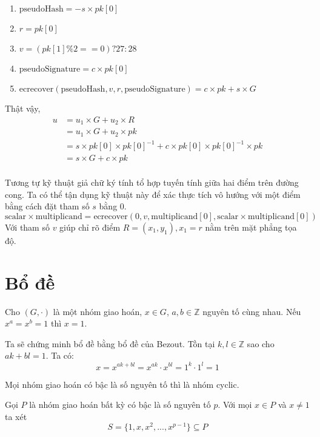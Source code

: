 \documentclass[../main.tex]{subfiles}
\begin{document}
\begin{enumerate}
    \item $\text{pseudoHash} = -s\times pk[0]$
    \item $r = pk[0]$
    \item $v =(pk[1]\%2 ==0)?27:28$
    \item $\text{pseudoSignature} = c \times pk[0]$
    \item $\text{ecrecover}(\text{pseudoHash}, v, r, \text{pseudoSignature}) = c\times pk + s \times G$
\end{enumerate}
Thật vậy,
\begin{align*}
    u   &= u_1 \times G + u_2 \times R\\
        &= u_1 \times G + u_2 \times pk\\
        &= s\times pk[0] \times pk[0]^{-1} + c\times pk[0] \times pk[0]^{-1} \times pk\\
        &= s \times G + c \times pk\\
\end{align*}

Tương tự kỹ thuật giả chữ ký tính tổ hợp tuyến tính giữa hai điểm trên đường cong. Ta có thể tận dụng kỹ thuật này để xác thực tích vô hướng với một điểm bằng cách đặt tham số $s$ bằng $0$.
\begin{equation*}
    \text{scalar} \times \text{multiplicand} = \text{ecrecover}(0,v,\text{multiplicand}[0],\text{scalar} \times \text{multiplicand}[0])
\end{equation*}
Với tham số $v$ giúp chỉ rõ điểm $R = (x_1,y_1), x_1 = r$ nằm trên mặt phẳng tọa độ.
\section{Bổ đề}
\begin{bd}
\label{bd:_primeGroup}
Cho $(G,\cdot)$ là một nhóm giao hoán, $x \in G$, $a,b \in \mathbb{Z}$ nguyên tố cùng nhau. Nếu $x^a = x^b = 1$ thì $x=1$.
\end{bd}

Ta sẽ chứng minh bổ đề bằng bổ đề của Bezout. Tồn tại $k,l \in \mathbb{Z}$ sao cho $ak+bl = 1$. Ta có:
\begin{equation*}
    x = x^{ak+bl} = x^{ak}\cdot x^{bl} = 1^k \cdot 1^l = 1
\end{equation*}

\begin{bd}
\label{bd:primeGroup}
Mọi nhóm giao hoán có bậc là số nguyên tố thì là nhóm cyclic.
\end{bd}
Gọi $P$ là nhóm giao hoán bất kỳ có bậc là số nguyên tố $p$. Với mọi $x \in P$ và $x \neq 1$ ta xét
\begin{equation*}
    S = \{1,x,x^2,...,x^{p-1}\} \subseteq P
\end{equation*}
\end{document}
